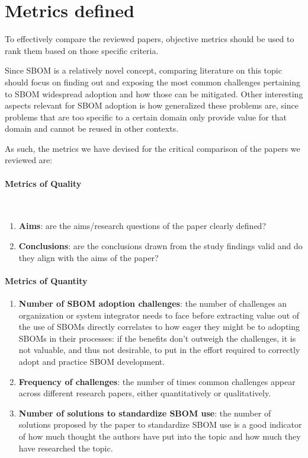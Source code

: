 \section{Metrics defined} \label{metrics}

To effectively compare the reviewed papers, objective metrics should be used to rank them based on those specific criteria.

\noindent Since SBOM is a relatively novel concept, comparing literature on this topic should focus on finding out and exposing the most common challenges pertaining to SBOM widespread adoption and how those can be mitigated. Other interesting aspects relevant for SBOM adoption is how generalized these problems are, since problems that are too specific to a certain domain only provide value for that domain and cannot be reused in other contexts.

\noindent As such, the metrics we have devised for the critical comparison of the papers we reviewed are:

\paragraph{Metrics of Quality}\mbox{}\\
\begin{enumerate}
    \item \textbf{Aims}: are the aims/research questions of the paper clearly defined?
    \item \textbf{Conclusions}: are the conclusions drawn from the study findings valid and do they align with the aims of the paper?
\end{enumerate}

\paragraph{Metrics of Quantity}
\begin{enumerate}
    \item \textbf{Number of SBOM adoption challenges}: the number of challenges an organization or system integrator needs to face before extracting value out of the use of SBOMs directly correlates to how eager they might be to adopting SBOMs in their processes: if the benefits don't outweigh the challenges, it is not valuable, and thus not desirable, to put in the effort required to correctly adopt and practice SBOM development.
    \item \textbf{Frequency of challenges}: the number of times common challenges appear across different research papers, either quantitatively or qualitatively.
    \item \textbf{Number of solutions to standardize SBOM use}: the number of solutions proposed by the paper to standardize SBOM use is a good indicator of how much thought the authors have put into the topic and how much they have researched the topic.
\end{enumerate}


